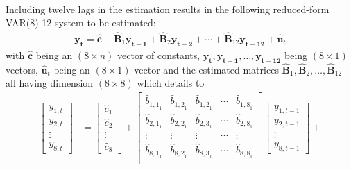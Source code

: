 \documentclass[a4paper,11pt,listof=nochaptergap,oneside,pointednumbers,bibtotoc,bigheadings,liststotoc]{scrbook}
\theoremstyle{mysatz}
\theoremstyle{mydefinition}
\theoremstyle{mybemerkung}
\let\oldhat\hat
\newcommand{\vect}[1]{\boldsymbol{\mathbf{#1}}}
\newcommand{\hatt}[1]{\oldhat{\boldsymbol{\mathbf{#1}}}}
\newcommand{\hattnobf}[1]{\oldhat{#1}}
\begin{document}
\begin{itemize}
\begin{enumerate}
\begin{equation}
\begin{split}
\end{split}
\end{equation}
Including twelve lags in the estimation results in the following reduced-form VAR(8)-12-system to be estimated:
	\begin{equation} \label{eq:VAR8_1}
	\begin{split}
		\vect{y_t} = {\hatt{c}} + {\hatt{B}_1}\vect{y_{t-1}} + {\hatt{B}_2}\vect{y_{t-2}} + \cdots + {\hatt{B}_{12}}\vect{y_{t-12}} + {\hatt{u}_t}
	\end{split}								
	\end{equation}	
with ${\hatt{c}}$ being an $(8 \times n)$ vector of constants, $\vect{y_t}, \vect{y_{t-1}}, \dots, \vect{y_{t-12}}$ being $(8 \times 1)$ vectors, ${\hatt{u}_t}$ being an $(8 \times 1)$ vector and the estimated matrices ${\hatt{B}_1}, {\hatt{B}_2}, \dots, {\hatt{B}_{12}}$ all having dimension $(8 \times 8)$
which details to
	\begin{equation} \label{eq:VAR8_2}
		\begin{split}
		\begin{bmatrix}
    		y_{1,t} \\
    		y_{2,t} \\
		\vdots \\
		y_{8,t}
 		\end{bmatrix} & = 
		\begin{bmatrix}
    		\hattnobf{c}_{{1}} \\
    		\hattnobf{c}_{{2}} \\
		\vdots \\
		\hattnobf{c}_{{8}}
 		\end{bmatrix} + 
		\begin{bmatrix}
    		\hattnobf{b}_{{1,1}_1} & \hattnobf{b}_{{1,2}_1} & \hattnobf{b}_{{1,2}_1} & \cdots & \hattnobf{b}_{{1,8}_1}\\
    		\hattnobf{b}_{{2,1}_1} & \hattnobf{b}_{{2,2}_1} & \hattnobf{b}_{{2,3}_1} & \cdots & \hattnobf{b}_{{2,8}_1}\\
		\vdots & \vdots & \vdots & \cdots & \vdots \\
		\hattnobf{b}_{{8,1}_1} & \hattnobf{b}_{{8,2}_1} & \hattnobf{b}_{{8,3}_1} & \cdots & \hattnobf{b}_{{8,8}_1}\\
 		\end{bmatrix} 
		\begin{bmatrix}
    		y_{1,t-1} \\
    		y_{2,t-1} \\
		\vdots \\
		y_{8, t-1}
 		\end{bmatrix} + \\

\end{split}
\end{equation}
\end{enumerate}
\end{itemize}
\end{document}
